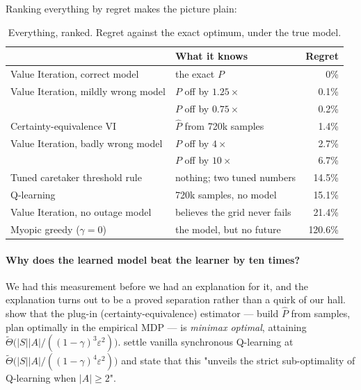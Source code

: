 \documentclass{ai-lab-report}
\begin{document}
Ranking everything by regret makes the picture plain:

\begin{table}[H]
\centering
\caption{Everything, ranked. Regret against the exact optimum, under the true model.}
\label{tab:a3rank}
\begin{tabular}{llr}
\toprule
& What it knows & Regret \\
\midrule
Value Iteration, correct model      & the exact $P$                    & 0\% \\
Value Iteration, mildly wrong model & $P$ off by $1.25\times$          & 0.1\% \\
                                    & $P$ off by $0.75\times$          & 0.2\% \\
Certainty-equivalence VI            & $\hat{P}$ from 720k samples      & 1.4\% \\
Value Iteration, badly wrong model  & $P$ off by $4\times$             & 2.7\% \\
                                    & $P$ off by $10\times$            & 6.7\% \\
Tuned caretaker threshold rule      & nothing; two tuned numbers       & 14.5\% \\
Q-learning                          & 720k samples, no model           & 15.1\% \\
Value Iteration, no outage model    & believes the grid never fails    & 21.4\% \\
Myopic greedy ($\gamma = 0$)        & the model, but no future         & 120.6\% \\
\bottomrule
\end{tabular}
\end{table}

\paragraph{Why does the learned model beat the learner by ten times?}
We had this measurement before we had an explanation for it, and the explanation turns out to be
a proved separation rather than a quirk of our hall. \citet{agarwal2020modelbased} show that the
plug-in (certainty-equivalence) estimator --- build $\hat{P}$ from samples, plan optimally in the
empirical MDP --- is \emph{minimax optimal}, attaining
$\tilde{\Theta}\bigl(|S||A| / ((1-\gamma)^3\varepsilon^2)\bigr)$.
\citet{li2024qlearning} settle vanilla synchronous Q-learning at
$\tilde{\Theta}\bigl(|S||A| / ((1-\gamma)^4\varepsilon^2)\bigr)$ and state that this "unveils the
strict sub-optimality of Q-learning when $|A| \geq 2$".
\end{document}
